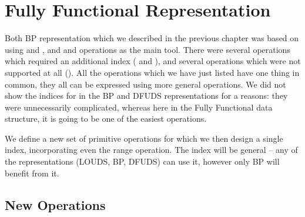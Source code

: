 
\section{Fully Functional Representation}

Both BP representation which we described in the previous chapter was based on using \rank{} and \select{}, and \match{} and \enclose{} operations as the main tool.
There were several operations which required an additional index (\childAny{} and \levelAncestor{}), and several operations which were not supported at all (\levelAny{}).
All the operations which we have just listed have one thing in common, they all can be expressed using more general operations.
We did not show the indices for \levelAncestor in the BP and DFUDS representations for a reasons: they were unnecessarily complicated, whereas here in the Fully Functional data structure, it is going to be one of the easiest operations.

We define a new set of primitive operations for which we then design a single index, incorporating even the range operation.
The index will be general -- any of the representations (LOUDS, BP, DFUDS) can use it, however only BP will benefit from it.

\subsection{New Operations}

